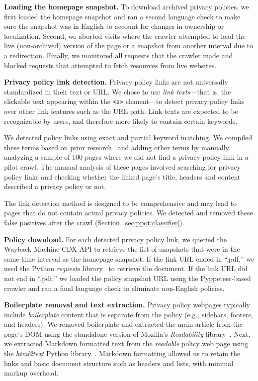 {\textbf{Loading the homepage snapshot.}}
To download archived privacy policies, we first loaded the homepage snapshot and ran a second language check to make sure the snapshot was in English to account for changes in ownership or localization.
Second, we aborted visits where the crawler attempted to load the live (non-archived) version of the page or a snapshot from another interval due to a redirection.
Finally, we monitored all requests that the crawler made and blocked requests that attempted to fetch resources from live websites.

{\textbf{Privacy policy link detection.}}
Privacy policy links are not universally standardized in their text or URL.
We chose to use \textit{link texts}---that is, the clickable text appearing within the \texttt{<a>} element---to detect privacy policy links over other link features such as the URL path. Link texts are expected to be recognizable by users, and therefore more likely to contain certain keywords.

We detected policy links using exact and partial keyword matching.
We compiled these terms based on prior research~\cite{libert2018automated} and adding other terms by manually analyzing a sample of 100 pages where we did not find a privacy policy link in a pilot crawl. 
The manual analysis of these pages involved searching for privacy policy links and checking whether the linked page’s title, headers and content described a privacy policy or not. 

The link detection method is designed to be comprehensive and may lead to pages that do not contain actual privacy policies.
We detected and removed these false positives after the crawl (Section~\ref{sec:ppot:classifier}).

{\textbf{Policy download.}}
For each detected privacy policy link, we queried the Wayback Machine CDX API to retrieve the list of snapshots that were in the same time interval as the homepage snapshot. 
If the link URL ended in ``.pdf,'' we used the Python \textit{requests} library~\cite{PyPI-requests} to retrieve the document.
If the link URL did not end in ``.pdf,'' we loaded the policy snapshot URL using the Pyppeteer-based crawler and ran a final language check to eliminate non-English policies.

{\textbf{Boilerplate removal and text extraction.}}
Privacy policy webpages typically include \emph{boilerplate} content that is separate from the policy (e.g., sidebars, footers, and headers). 
We removed boilerplate and extracted the main article from the page's DOM using the standalone version of Mozilla’s \emph{Readability} library~\cite{readability-mozilla}. 
Next, we extracted Markdown formatted text from the \emph{readable} policy web page using the \emph{html2text} Python library~\cite{html2text-github}. Markdown formatting allowed us to retain the links and basic document structure such as headers and lists, with minimal markup overhead.

